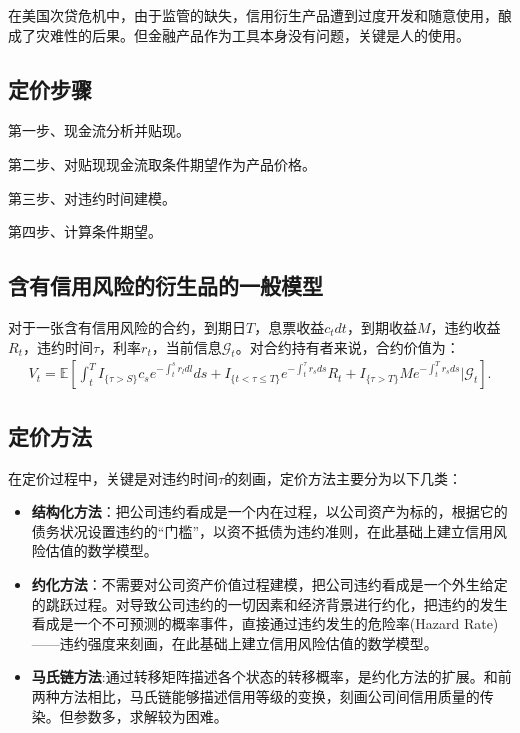 \documentclass{article}
\begin{document}
在美国次贷危机中，由于监管的缺失，信用衍生产品遭到过度开发和随意使用，酿成了灾难性的后果。但金融产品作为工具本身没有问题，关键是人的使用。

\subsection{定价步骤}
第一步、现金流分析并贴现。

第二步、对贴现现金流取条件期望作为产品价格。

第三步、对违约时间建模。

第四步、计算条件期望。


\subsection{含有信用风险的衍生品的一般模型}
对于一张含有信用风险的合约，到期日$T$，息票收益$c_tdt$，到期收益$M$，违约收益$R_t$，违约时间$\tau$，利率$r_t$，当前信息$\mathcal{G}_t$。对合约持有者来说，合约价值为：
\begin{eqnarray}
  V_t=\mathbb{E}\left[\int_t^T I_{\{\tau>S\}} c_s e^{-\int_t^s r_l d l} d s+I_{\{t<\tau \leq T\}} e^{-\int_t^\tau r_s d s} R_t+I_{\{\tau>T\}} M e^{-\int_t^T r_s d s} \bigg| \mathcal{G}_t\right].
\end{eqnarray}



\subsection{定价方法}
在定价过程中，关键是对违约时间$\tau$的刻画，定价方法主要分为以下几类：
\begin{itemize}
  \item \textbf{结构化方法}：把公司违约看成是一个内在过程，以公司资产为标的，根据它的债务状况设置违约的“门槛”，以资不抵债为违约准则，在此基础上建立信用风险估值的数学模型。
  \item \textbf{约化方法}：不需要对公司资产价值过程建模，把公司违约看成是一个外生给定的跳跃过程。对导致公司违约的一切因素和经济背景进行约化，把违约的发生看成是一个不可预测的概率事件，直接通过违约发生的危险率(Hazard Rate)——违约强度来刻画，在此基础上建立信用风险估值的数学模型。
  \item \textbf{马氏链方法}:通过转移矩阵描述各个状态的转移概率，是约化方法的扩展。和前两种方法相比，马氏链能够描述信用等级的变换，刻画公司间信用质量的传染。但参数多，求解较为困难。
\end{itemize}
\end{document}
